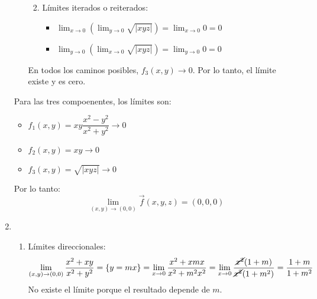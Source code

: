 \begin{enumerate}[label=\color{red}\textbf{\arabic*)}, leftmargin=*]
\begin{itemize}
\begin{enumerate}
$$$$
\item Límites iterados o reiterados:
\begin{itemize}[label=\textbullet]
\item $\lim_{ x \to 0 }\left(\lim_{ y \to 0 }\sqrt{ |xyz| }\right)=\lim_{ x \to 0 }0=0$
\item $\lim_{ y \to 0 }\left( \lim_{ x \to 0 }\sqrt{ |xyz| } \right)=\lim_{ y \to 0 }0=0$
\end{itemize}
\end{enumerate}
En todos los caminos posibles, $f_{3}(x,y)\to 0$. Por lo tanto, el límite existe y es cero. 
\end{itemize}
Para las tres compoenentes, los límites son: 
\begin{itemize}
\item $f_{1}(x,y)=xy\dfrac{x^{2}-y^{2}}{x^{2}+y^{2}}\to 0$
\item $f_{2}(x,y)=xy\to 0$
\item $f_{3}(x,y)=\sqrt{ |xyz| }\to 0$
\end{itemize}
Por lo tanto: $$
\lim_{ (x,y) \to (0,0) }\vec{f}(x,y,z)=(0,0,0)
$$
\item {}
\begin{enumerate}[label=\arabic*)]
\item Límites direccionales: $$
\lim_{ (x,y) \to (0,0) }\dfrac{x^{2}+xy}{x^{2}+y^{2}}=\{ y=mx \}=\lim_{ x \to 0 }\dfrac{x^{2}+xmx}{x^{2}+m^{2}x^{2}}=\lim_{ x \to 0 }\dfrac{\cancel{x^{2}}(1+m)}{\cancel{x^{2}}(1+m^{2})}=\dfrac{1+m}{1+m^{2}}
$$
No existe el límite porque el resultado depende de $m$.
\end{enumerate}


\end{enumerate}
